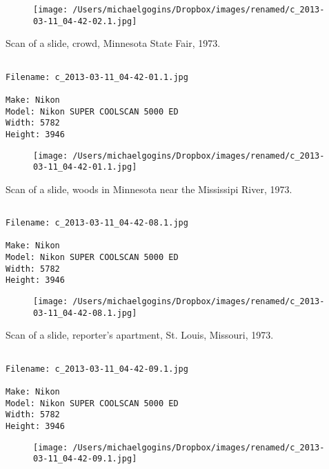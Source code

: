 \begin{figure}
\texttt{[image: /Users/michaelgogins/Dropbox/images/renamed/c\_2013-03-11\_04-42-02.1.jpg]}
\end{figure}
    
\clearpage
\onecolumn
\noindent Scan of a slide, crowd, Minnesota State Fair, 1973.
\noindent
\begin{lstlisting}

Filename: c_2013-03-11_04-42-01.1.jpg

Make: Nikon
Model: Nikon SUPER COOLSCAN 5000 ED
Width: 5782
Height: 3946
\end{lstlisting}
\clearpage

\begin{figure}
\texttt{[image: /Users/michaelgogins/Dropbox/images/renamed/c\_2013-03-11\_04-42-01.1.jpg]}
\end{figure}
    
\clearpage
\onecolumn
\noindent Scan of a slide, woods in Minnesota near the Mississipi River, 1973.
\noindent
\begin{lstlisting}

Filename: c_2013-03-11_04-42-08.1.jpg

Make: Nikon
Model: Nikon SUPER COOLSCAN 5000 ED
Width: 5782
Height: 3946
\end{lstlisting}
\clearpage

\begin{figure}
\texttt{[image: /Users/michaelgogins/Dropbox/images/renamed/c\_2013-03-11\_04-42-08.1.jpg]}
\end{figure}
    
\clearpage
\onecolumn
\noindent Scan of a slide, reporter's apartment, St. Louis, Missouri, 1973.
\noindent
\begin{lstlisting}

Filename: c_2013-03-11_04-42-09.1.jpg

Make: Nikon
Model: Nikon SUPER COOLSCAN 5000 ED
Width: 5782
Height: 3946
\end{lstlisting}
\clearpage

\begin{figure}
\texttt{[image: /Users/michaelgogins/Dropbox/images/renamed/c\_2013-03-11\_04-42-09.1.jpg]}
\end{figure}
    

